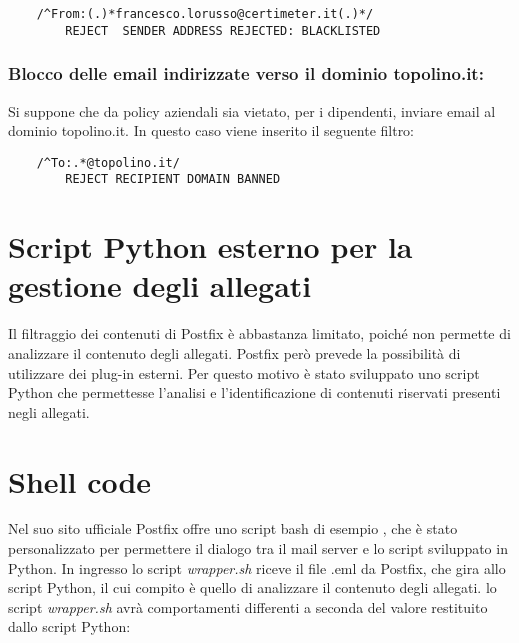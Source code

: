    \begin{verbatim}
    /^From:(.)*francesco.lorusso@certimeter.it(.)*/
        REJECT  SENDER ADDRESS REJECTED: BLACKLISTED
    \end{verbatim}

    \subsubsection{Blocco delle email indirizzate verso il dominio topolino.it:}
    Si suppone che da policy aziendali sia vietato, per i dipendenti, 
    inviare email al dominio topolino.it.
    In questo caso viene inserito il seguente filtro:

    \begin{verbatim}
    /^To:.*@topolino.it/
        REJECT RECIPIENT DOMAIN BANNED
    \end{verbatim}


    \section{Script Python esterno per la gestione degli allegati}
    Il filtraggio dei contenuti di Postfix è abbastanza limitato, poiché non permette di analizzare il contenuto
    degli allegati. Postfix però prevede la possibilità di utilizzare dei plug-in esterni. Per questo motivo è stato
    sviluppato uno script Python che permettesse l'analisi e l'identificazione di contenuti riservati presenti 
    negli allegati.


    \section{Shell code}
    Nel suo sito ufficiale Postfix offre uno script bash di esempio \cite{Postfix3}, che è stato personalizzato per 
    permettere il dialogo tra il mail server e lo script sviluppato in Python.
    In ingresso lo script \textit{wrapper.sh} riceve il file .eml da Postfix, che gira allo script Python,  
    il cui compito è quello di analizzare il contenuto degli allegati.
    lo script \textit{wrapper.sh} avrà comportamenti differenti a seconda del valore restituito dallo script Python:
    

